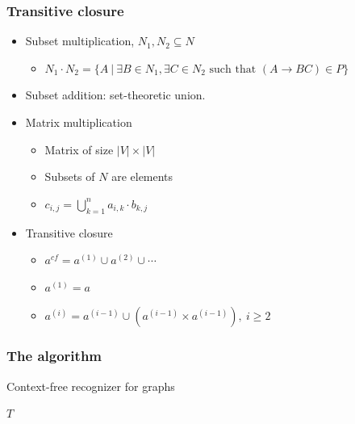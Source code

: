 \documentclass[xcolor=table]{beamer}
\begin{document}
\begin{frame}
  \frametitle{Transitive closure}
  \begin{itemize}
    \item Subset multiplication, $N_1, N_2 \subseteq N$
    \begin{itemize}
      \item $N_1 \cdot N_2 = \{A~|~\exists B \in N_1, \exists C \in N_2 \text{ such that }(A \rightarrow B C) \in P\}$
    \end{itemize}
    \item Subset addition: set-theoretic union.
  \end{itemize}

  \begin{itemize}
    \item Matrix multiplication
    \begin{itemize}
      \item Matrix of size $|V| \times |V|$
      \item Subsets of $N$ are elements
      \item $c_{i,j} = \bigcup^{n}_{k=1}{a_{i,k} \cdot b_{k,j}}$
    \end{itemize}
  \end{itemize}
  \begin{itemize}
    \item Transitive closure
  \begin{itemize}
    \item $a^{cf} = a^{(1)} \cup a^{(2)} \cup \cdots$
    \item $a^{(1)} = a$
    \item $a^{(i)} = a^{(i-1)} \cup (a^{(i-1)} \times a^{(i-1)}), ~i \ge 2$
  \end{itemize}
\end{itemize}

\end{frame}

\begin{frame} \frametitle{The algorithm}

\begin{algorithm}[H]
\begin{algorithmic}[1]
\caption{Context-free recognizer for graphs}
\label{alg:graphParse}

    \EndFor

    \EndWhile
\State \Return $T$
\EndFunction
\end{algorithmic}
\end{algorithm}

\end{frame}
\end{document}
